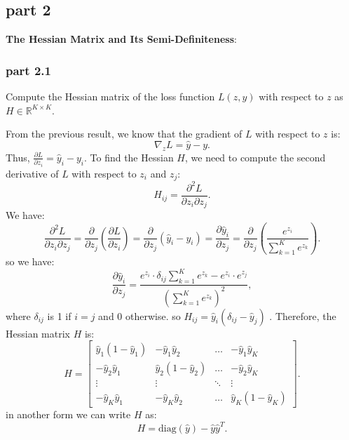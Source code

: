 \subsection{part 2}
\textbf{The Hessian Matrix and Its Semi-Definiteness}:
\subsubsection{part 2.1}
Compute the Hessian matrix of the loss function \( L(z, y) \) with respect to \( z \) as \( H \in \mathbb{R}^{K \times K} \).
\begin{qsolve}
	\begin{qsolve}[]
		From the previous result, we know that the gradient of \( L \) with respect to \( z \) is:
		\[
		\nabla_z L = \hat{y} - y.
		\]
		Thus, \( \frac{\partial L}{\partial z_i} = \hat{y}_i - y_i \).
		To find the Hessian \( H \), we need to compute the second derivative of \( L \) with respect to \( z_i \) and \( z_j \):
		\[
		H_{ij} = \frac{\partial^2 L}{\partial z_i \partial z_j}.
		\]
		We have:
		\[
		\frac{\partial^2 L}{\partial z_i \partial z_j} = \frac{\partial}{\partial z_j} \left( \frac{\partial L}{\partial z_i} \right) = \frac{\partial}{\partial z_j} \left( \hat{y}_i - y_i \right) = \frac{\partial \hat{y}_i}{\partial z_j} = \frac{\partial}{\partial z_j} \left( \frac{e^{z_i}}{\sum_{k=1}^K e^{z_k}} \right).
		\]
		so we have:
		\[
		\frac{\partial \hat{y}_i}{\partial z_j} = \frac{e^{z_i} \cdot \delta_{ij} \sum_{k=1}^K e^{z_k} - e^{z_i} \cdot e^{z_j}}{\left( \sum_{k=1}^K e^{z_k} \right)^2},
		\]
		where \( \delta_{ij} \) is 1 if \( i = j \) and 0 otherwise. so \(H_{ij} = \hat{y}_i (\delta_{ij} - \hat{y}_j)\) . Therefore, the Hessian matrix \( H \) is:
		\[
		H = \begin{bmatrix} 
		\hat{y}_1 (1 - \hat{y}_1) & -\hat{y}_1 \hat{y}_2 & \dots & -\hat{y}_1 \hat{y}_K \\
		-\hat{y}_2 \hat{y}_1 & \hat{y}_2 (1 - \hat{y}_2) & \dots & -\hat{y}_2 \hat{y}_K \\
		\vdots & \vdots & \ddots & \vdots \\
		-\hat{y}_K \hat{y}_1 & -\hat{y}_K \hat{y}_2 & \dots & \hat{y}_K (1 - \hat{y}_K)
		\end{bmatrix}.
		\]
		in another form we can write \( H \) as:
		\[
		H = \text{diag}(\hat{y}) - \hat{y} \hat{y}^T.
		\]

	\end{qsolve}
\end{qsolve}

